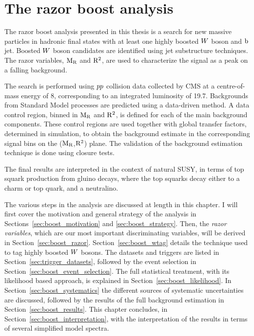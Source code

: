 \chapter{The razor boost analysis \label{chap:razorboost}}

\vspace{1eM}

The razor boost analysis presented in this thesis is a search for new massive particles in hadronic
final states with at least one highly boosted $W$ boson and $\mathrm{b}$ jet.  Boosted $W$ boson
candidates are identified using jet substructure techniques. The razor variables, $\mathrm{M_R}$ and $\mathrm{R^2}$,
are used to characterize the signal as a peak on a falling background.

The search is performed using ${p}{p}$ collision data collected by CMS at a centre-of-mass energy of
8\TeV, corresponding to an integrated luminosity of 19.7\fbinv.  
Backgrounds from Standard Model processes are predicted using a data-driven method. 
A data control region, binned in $\mathrm{M_R}$ and $\mathrm{R^2}$, is defined for each of the main background
components. These control regions are used together with global transfer factors, determined in
simulation, to obtain the background estimate in the corresponding signal bins on the ($\mathrm{M_R}$,$\mathrm{R^2}$)
plane. The validation of the background estimation technique is done using closure tests. 

The final results are interpreted in the context of natural SUSY, in terms of top squark production
from gluino decays, where the top squarks decay either to a charm or top quark, and a neutralino. 


The various steps in the analysis are discussed at length in this chapter. 
I will first cover the motivation and general strategy of the analysis in 
Sections~\ref{sec:boost_motivation} and \ref{sec:boost_strategy}. Then, the \textit{razor
variables}, which are our most important discriminating variables, will be derived in 
Section~\ref{sec:boost_razor}. Section~\ref{sec:boost_wtag} details the technique used to tag highly
boosted $W$ bosons. 
The datasets and triggers are listed in Section~\ref{sec:trigger_datasets}, followed by the event
selection in Section~\ref{sec:boost_event_selection}. 
The full statistical treatment, with its likelihood based approach, is explained in 
Section~\ref{sec:boost_likelihood}. In Section~\ref{sec:boost_systematics} the different sources of
systematic uncertainties are discussed, followed by the results of the full background estimation in
Section~\ref{sec:boost_results}. This chapter concludes, in Section~\ref{sec:boost_interpretation},
with the interpretation of the results in terms of several simplified model spectra. 

